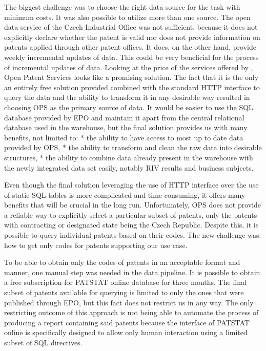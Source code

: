 The biggest challenge was to choose the right data source for the task with minimum costs. It was also possible to utilize more than one source. The open data service of the Czech Industrial Office was not sufficient, because it does not explicitly declare whether the patent is valid nor does not provide information on patents applied through other patent offices. It does, on the other hand, provide weekly incremental updates of data. This could be very beneficial for the process of incremental updates of data. Looking at the price of the services offered by , Open Patent Services looks like a promising solution. The fact that it is the only an entirely free solution provided combined with the standard HTTP interface to query the data and the ability to transform it in any desirable way resulted in choosing OPS as the primary source of data. It would be easier to use the SQL database provided by EPO and maintain it apart from the central relational database used in the warehouse, but the final solution provides us with many benefits, not limited to:
\begitems
* the ability to have access to most up to date data provided by OPS,
* the ability to transform and clean the raw data into desirable structures,
* the ability to combine data already present in the warehouse with the newly integrated data set easily, notably RIV results and business subjects.
\enditems

Even though the final solution leveraging the use of HTTP interface over the use of static SQL tables is more complicated and time consuming, it offers many benefits that will be crucial in the long run.
Unfortunately, OPS does not provide a reliable way to explicitly select a particular subset of patents, only the patents with contracting or designated state being the Czech Republic. Despite this, it is possible to query individual patents based on their codes. The new challenge was: how to get only codes for patents supporting our use case.


To be able to obtain only the codes of patents in an acceptable format and manner, one manual step was needed in the data pipeline. It is possible to obtain a free subscription for PATSTAT  online database for three months. The final subset of patents available for querying is limited to only the ones that were published through EPO, but this fact does not restrict us in any way. The only restricting outcome of this approach is not being able to automate the process of producing a report containing said patents because the interface of PATSTAT online is specifically designed to allow only human interaction using a limited subset of SQL directives. 


